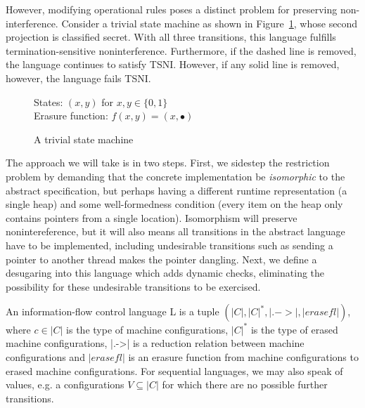 However, modifying operational rules poses a distinct problem for
preserving non-interference.  Consider a trivial state machine as shown
in Figure~\ref{fig:trivial-sm}, whose second projection is classified
secret.  With all three transitions, this language fulfills
termination-sensitive noninterference.  Furthermore, if the dashed line
is removed, the language continues to satisfy TSNI.  However, if any
solid line is removed, however, the language fails TSNI.

\begin{figure}
    States: $(x,y)$ for $x,y \in \{0,1\}$ \\
    Erasure function: $f(x,y) = (x,\bullet)$

    \begin{center}\end{center}

    \label{fig:trivial-sm}
    \caption{A trivial state machine}
\end{figure}

The approach we will take is in two steps.  First, we sidestep the
restriction problem by demanding that the concrete implementation be
\emph{isomorphic} to the abstract specification, but perhaps having a different
runtime representation (a single heap) and some well-formedness
condition (every item on the heap only contains pointers from a single
location).  Isomorphism will preserve nonintereference, but it will also means all
transitions in the abstract language have to be implemented, including
undesirable transitions such as sending a pointer to another thread makes
the pointer dangling.  Next, we define a desugaring into this language
which adds dynamic checks, eliminating the possibility for these undesirable
transitions to be exercised.


\begin{definition}
    An information-flow control language L is a tuple $(|C|, |C|^*, |.->|,
    |erasef l|)$, where $c \in |C|$ is the type of machine configurations,
    $|C|^*$ is the type of erased machine configurations, |.->| is a
    reduction relation between machine configurations and $|erasef l|$
    is an erasure function from machine configurations to erased machine
    configurations.  For sequential languages, we may also speak of
    values, e.g. a configurations $V \subseteq |C|$ for which there are
    no possible further transitions.
\end{definition}

